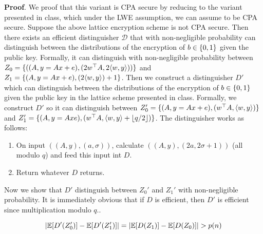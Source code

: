 \documentclass{article}
\begin{document}
\begin{enumerate}[,start=5]
\begin{itemize}
\begin{mdbmarginx}{1ex}{0pt}{1ex}{0pt}%
\noindent{}\textbf{Proof}.  We proof that this variant is CPA secure by reducing to the variant presented in class, which under the 
LWE assumption, we can assume to be CPA secure. Suppose the above lattice encryption scheme is not 
CPA secure. Then there exists an efficient distinguisher $\mathcal{D}$ that with non-negligible
probability can distinguish between the distributions of the encryption of $b \in \{0,1\}$ given the 
public key. Formally, it can distinguish with non-negligible probability between 
$Z_0 = \{((A,y = Ax + e),(2w^\top A, 2\langle w,y \rangle)) \}$ and $Z_1 = \{(A, y = Ax + e),(2 \langle w,y \rangle) + 1 \}$. Then
we construct a distinguisher $D'$ which can distinguish between the distributions of the encryption
of $b \in \{0,1\}$ given the public key in the lattice scheme presented in class. Formally, we 
construct $D'$ so it can distinguish between $Z_0' = \{(A,y= Ax + e),(w^{\top}A, \langle w,y \rangle) \}$ and 
$Z_1' = \{(A, y = Ax e),(w^\top A, \langle w,y \rangle + \lfloor q/2 \rfloor) \}$. The distinguisher works as follows:%

\begin{enumerate}[noitemsep,topsep=\mdcompacttopsep]%

\item{}On input $((A,y),(a,\sigma))$, calculate $((A,y), (2a, 2\sigma + 1))$ (all modulo $q$) and 
feed this input int $D$.%

\item{}Return whatever $D$ returns.%
\end{enumerate}%

\noindent{}Now we show that $D'$ distinguish between $Z_0'$ and $Z_1'$ with non-negligible probability. It 
is immediately obvious that if $D$ is efficient, then $D'$ is efficient since multiplication
modulo $q$..%
\end{mdbmarginx}%
\noindent\noindent\[%
|\E[D'(Z_0')] - \E[D'(Z_1')]| =  |\E[D(Z_1)] - \E[D(Z_0)]| > p(n)
\]%


\end{itemize}
\end{enumerate}
\end{document}
